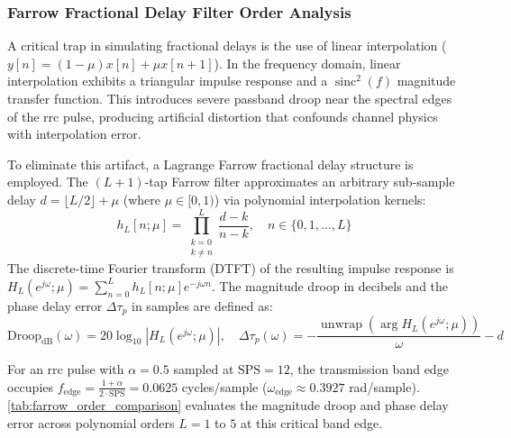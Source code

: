 \documentclass[Markos_Delaportas_1316.tex]{subfiles}
\begin{document}
\subsubsection{Farrow Fractional Delay Filter Order Analysis}
\label{subsubsec:farrow_filter_analysis}
A critical trap in simulating fractional delays is the use of linear
interpolation ($y[n] = (1-\mu)x[n] + \mu x[n+1]$).
In the frequency domain, linear interpolation exhibits a triangular
impulse response and a $\operatorname{sinc}^2(f)$
magnitude transfer function. This introduces severe passband droop
near the spectral edges of the \gls{rrc} pulse,
producing artificial distortion that confounds channel physics with
interpolation error.

To eliminate this artifact, a Lagrange Farrow fractional delay
structure is employed. The $(L+1)$-tap Farrow filter
approximates an arbitrary sub-sample delay $d = \lfloor L/2 \rfloor +
\mu$ (where $\mu \in [0, 1)$) via polynomial
interpolation kernels:
\begin{equation}
    h_L[n; \mu] = \prod_{\substack{k=0 \\ k \neq n}}^{L} \frac{d -
    k}{n - k}, \quad n \in \{0, 1, \dots, L\}
    \label{eq:farrow_lagrange_kernel}
\end{equation}
The discrete-time Fourier transform (DTFT) of the resulting impulse
response is $H_L(e^{j\omega}; \mu) = \sum_{n=0}^{L} h_L[n; \mu]
e^{-j\omega n}$.
The magnitude droop in decibels and the phase delay error $\Delta
\tau_p$ in samples are defined as:
\begin{equation}
    \text{Droop}_{\text{dB}}(\omega) = 20 \log_{10} \left|
    H_L(e^{j\omega}; \mu) \right|, \quad \Delta \tau_p(\omega) =
    -\frac{\operatorname{unwrap}(\arg H_L(e^{j\omega}; \mu))}{\omega} - d
    \label{eq:farrow_droop_and_phase_error}
\end{equation}

For an \gls{rrc} pulse with $\alpha = 0.5$ sampled at $\text{SPS} =
12$, the transmission band edge occupies
$f_{\text{edge}} = \frac{1+\alpha}{2 \cdot \text{SPS}} = 0.0625$
cycles/sample ($\omega_{\text{edge}} \approx 0.3927$ rad/sample).
\cref{tab:farrow_order_comparison} evaluates the magnitude droop and
phase delay error across polynomial orders $L = 1$ to $5$
at this critical band edge.
\end{document}
